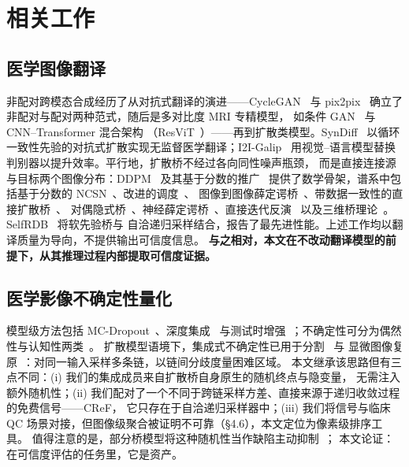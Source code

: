 \section{相关工作}
\label{sec:related}

\subsection{医学图像翻译}
非配对跨模态合成经历了从对抗式翻译的演进——CycleGAN~\cite{zhu2017cyclegan} 与
pix2pix~\cite{isola2017pix2pix} 确立了非配对与配对两种范式，随后是多对比度 MRI 专精模型，
如条件 GAN~\cite{dar2019cgan} 与 CNN--Transformer 混合架构
（ResViT~\cite{dalmaz2022resvit}）——再到扩散类模型。SynDiff~\cite{ozbey2023syndiff}
以循环一致性先验的对抗式扩散实现无监督医学翻译；I2I-Galip~\cite{korkmaz2025i2igalip}
用视觉--语言模型替换判别器以提升效率。平行地，扩散桥不经过各向同性噪声瓶颈，
而是直接连接源与目标两个图像分布：DDPM~\cite{ho2020ddpm} 及其基于分数的推广~\cite{song2021scoresde}
提供了数学骨架，谱系中包括基于分数的 NCSN~\cite{song2019ncsn}、改进的调度~\cite{nichol2021iddpm}、
图像到图像薛定谔桥~\cite{liu2023i2sb}、带数据一致性的直接扩散桥~\cite{chung2023directbridge}、
对偶隐式桥~\cite{su2023ddib}、神经薛定谔桥~\cite{kim2024nsb}、直接迭代反演~\cite{delbracio2023indi}
以及三维桥理论~\cite{zhang2025bridge3d}。SelfRDB~\cite{arslan2025selfrdb} 将软先验桥与
自洽递归采样结合，报告了最先进性能。上述工作均以翻译质量为导向，不提供输出可信度信息。
\textbf{与之相对，本文在不改动翻译模型的前提下，从其推理过程内部提取可信度证据。}

\subsection{医学影像不确定性量化}
模型级方法包括 MC-Dropout~\cite{gal2016mcdropout}、深度集成~\cite{lakshminarayanan2017ensembles}
与测试时增强~\cite{ayhan2018tta}；不确定性可分为偶然性与认知性两类~\cite{kendall2017uncertainties}。
扩散模型语境下，集成式不确定性已用于分割~\cite{wolleb2022diffusionensembles} 与
显微图像复原~\cite{osuna2024microscopy}：对同一输入采样多条链，以链间分歧度量困难区域。
本文继承该思路但有三点不同：(i) 我们的集成成员来自扩散桥自身原生的随机终点与隐变量，
无需注入额外随机性；(ii) 我们配对了一个不同于跨链采样方差、直接来源于递归收敛过程的免费信号——CReF，
它只存在于自洽递归采样器中；(iii) 我们将信号与临床 QC 场景对接，但图像级聚合被证明不可靠（\S4.6），本文定位为像素级排序工具。
值得注意的是，部分桥模型将这种随机性当作缺陷主动抑制~\cite{song2024ccbm}；
本文论证：在可信度评估的任务里，它是资产。

